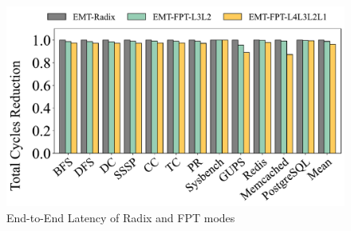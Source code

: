 \begin{figure}
    \centering
    \includegraphics[width=0.85\linewidth]{graph/fpt_e2e_unified_never.pdf}
    \caption{End-to-End Latency of Radix and FPT modes}
    \label{fig:fpte2e}
\end{figure}


